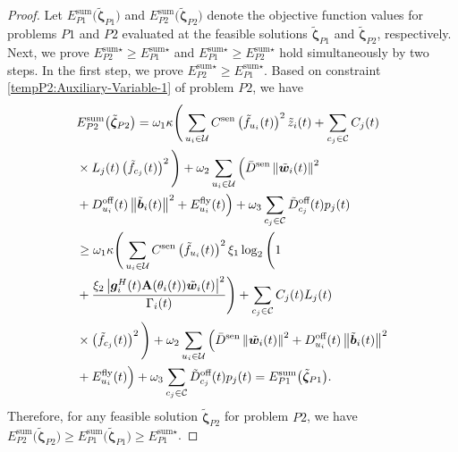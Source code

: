 \documentclass[10pt,journal,compsoc]{IEEEtran}
\newtheorem*{proof}{Proof}
\begin{document}
\begin{proof}
    Let $E^{\text{sum}}_{P1}\big(\tilde{\bm{\zeta}}_{P1}\big)$ and $E^{\text{sum}}_{P2}\big(\tilde{\bm{\zeta}}_{P2}\big)$ denote the objective function values for problems $P1$ and $P2$ evaluated at the feasible solutions $\tilde{\bm{\zeta}}_{P1}$ and $\tilde{\bm{\zeta}}_{P2}$, respectively. 
    Next, we prove ${E}_{P2}^{\text{sum} \star} \ge {E}_{P1}^{\text{sum} \star}$ and ${E}_{P1}^{\text{sum} \star} \ge {E}_{P2}^{\text{sum} \star}$ hold simultaneously by two steps.
    In the first step, we prove ${E}_{P2}^{\text{sum} \star} \ge {E}_{P1}^{\text{sum} \star}$. 
    Based on constraint \eqref{tempP2:Auxiliary-Variable-1} of problem $P2$, we have
    \begin{align}\label{P1-P2-Relation}
        & E^{\text{sum}}_{P2}\big(\tilde{\bm{\zeta}}_{P2}\big) = \omega_{1}\kappa \Bigg(\sum_{u_{i} \in \mathcal{U}}C^{\text{sen}}\left(\tilde{f}_{u_{i}}(t)\right)^{2}\tilde{z}_{i}(t) + \sum_{c_{j} \in \mathcal{C}} C_{{j}}(t) \notag \\
        & \times L_{j}(t) \left(\tilde{f}_{c_{j}}(t)\right)^{2} \Bigg) + \omega_{2}\sum_{u_{i} \in \mathcal{U}} \Big(\bar{D}^{\text{sen}} \left\|\tilde{\bm{w}}_{i}(t)\right\|^{2} \notag \\ 
        & + D_{u_{i}}^{\text{off}}(t)\left\|\tilde{\bm{b}}_{i}(t)\right\|^{2} + E_{u_{i}}^{\text{fly}}(t)\Big) + \omega_{3}\sum_{c_{j} \in \mathcal{C}}\tilde{D}_{c_{j}}^{\text{off}}(t) p_{j}(t) \notag \\
        & \ge \omega_{1}\kappa \Bigg(\sum_{u_{i} \in \mathcal{U}} C^{\text{sen}}\left(\tilde{f}_{u_{i}}(t)\right)^{2} \xi_{1} \log_2 \Bigg(1 \notag \\
        & + \frac{\xi_{2} \left|\bm{g}^{H}_{i}(t)\mathbf{A}(\theta_{i}(t)) \tilde{\bm{w}}_{i}(t)\right|^{2}}{\Gamma_{i}(t)} \Bigg)  + \sum_{c_{j} \in \mathcal{C}} C_{{j}}(t) L_{j}(t)  \notag \\
        & \times \left(\tilde{f}_{c_{j}}(t)\right)^{2} \Bigg) + \omega_{2}\sum_{u_{i} \in \mathcal{U}} \Big(\bar{D}^{\text{sen}}\left\|\tilde{\bm{w}}_{i}(t)\right\|^{2} + D_{u_{i}}^{\text{off}}(t) \left\|\tilde{\bm{b}}_{i}(t)\right\|^{2} \notag \\
        & + E_{u_{i}}^{\text{fly}}(t)\Big) + \omega_{3}\sum_{c_{j} \in \mathcal{C}}\tilde{D}_{c_{j}}^{\text{off}}(t)p_{j}(t) = E^{\text{sum}}_{P1}\big(\tilde{\bm{\zeta}}_{P1}\big).
    \end{align}
    Therefore, for any feasible solution $\tilde{\bm{\zeta}}_{P2}$ for problem $P2$, we have $ E^{\text{sum}}_{P2}\big(\tilde{\bm{\zeta}}_{P2}\big) \ge E^{\text{sum}}_{P1}\big(\tilde{\bm{\zeta}}_{P1}\big) \ge {E}_{P1}^{\text{sum} \star}$.

\end{proof}
\end{document}
